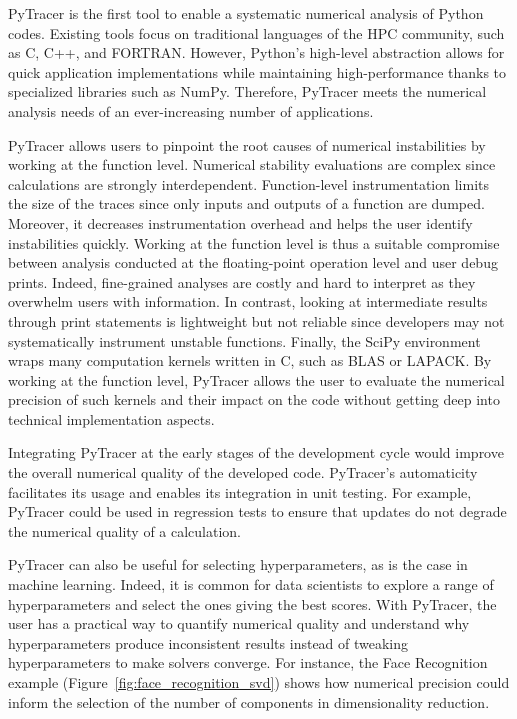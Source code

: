 \documentclass[10pt,journal,compsoc]{IEEEtran}
\newcommand{\pytracer}[0]{PyTracer\xspace}
\begin{document}
\pytracer is the first tool to enable a systematic numerical analysis of Python
codes. Existing tools focus on traditional languages of the HPC community, such
as C, C++, and FORTRAN. However, Python's high-level abstraction allows for
quick application implementations while maintaining high-performance thanks to
specialized libraries such as NumPy. Therefore, \pytracer meets the numerical
analysis needs of an ever-increasing number of applications.

\pytracer allows users to pinpoint the root causes of numerical instabilities by
working at the function level. Numerical stability evaluations are complex since
calculations are strongly interdependent. Function-level instrumentation limits
the size of the traces since only inputs and outputs of a function are dumped.
Moreover, it decreases instrumentation overhead and helps the user identify
instabilities quickly. Working at the function level is thus a suitable
compromise between analysis conducted at the floating-point operation level and
user debug prints. Indeed,  fine-grained analyses are costly and hard to
interpret as they overwhelm users with information. In contrast, looking at
intermediate results through print statements is lightweight but not reliable
since developers may not systematically instrument unstable functions. Finally,
the SciPy environment wraps many computation kernels written in C, such as BLAS
or LAPACK. By working at the function level, \pytracer allows the user to
evaluate the numerical precision of such kernels and their impact on the code
without getting deep into technical implementation aspects. 

Integrating \pytracer at the early stages of the development cycle would improve
the overall numerical quality of the developed code. \pytracer's automaticity
facilitates its usage and enables its integration in unit testing. For example,
\pytracer could be used in regression tests to ensure that updates do not
degrade the numerical quality of a calculation. 

\pytracer can also be useful for selecting hyperparameters, as is the case in
machine learning. Indeed, it is common for data scientists to explore a range of
hyperparameters and select the ones giving the best scores. With \pytracer, the
user has a practical way to quantify numerical quality and understand why
hyperparameters produce inconsistent results instead of tweaking hyperparameters
to make solvers converge. For instance, the Face Recognition example
(Figure~\ref{fig:face_recognition_svd}) shows how numerical precision could
inform the selection of the number of components in dimensionality reduction. 
\end{document}
